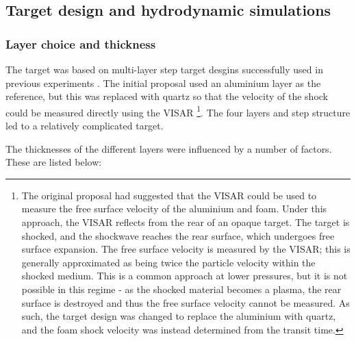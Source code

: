 \subsection{Target design and hydrodynamic simulations} \label{Target Design}

\subsubsection{Layer choice and thickness}

The target was based on multi-layer step target desgins successfully used in previous experiments \cite{Falk2014a, Falk2020}. The initial proposal used an aluminium layer as the reference, but this was replaced with quartz so that the velocity of the shock could be measured directly using the VISAR \footnote{The original proposal had suggested that the VISAR could be used to measure the free surface velocity of the aluminium and foam. Under this approach, the VISAR reflects from the rear of an opaque target. The target is shocked, and the shockwave reaches the rear surface, which undergoes free surface expansion. The free surface velocity is measured by the VISAR; this is generally approximated as being twice the particle velocity within the shocked medium. This is a common approach at lower pressures, but it is not possible in this regime - as the shocked material becomes a plasma, the rear surface is destroyed and thus the free surface velocity cannot be measured. As such, the target design was changed to replace the aluminium with quartz, and the foam shock velocity was instead determined from the transit time.}. The four layers and step structure led to a relatively complicated target.

The thicknesses of the different layers were influenced by a number of factors. These are listed below:

